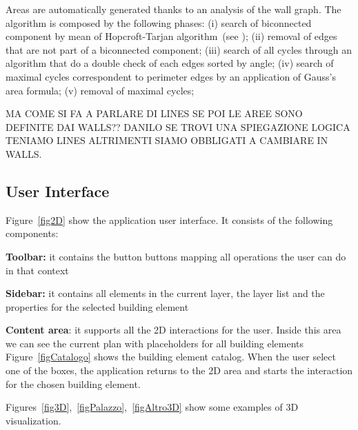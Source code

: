 Areas are automatically generated thanks to an analysis of the wall graph. The algorithm is composed by the following phases: (i) search of biconnected component by mean of Hopcroft-Tarjan algorithm~(see \cite{Hopcroft:1973:AEA:362248.362272}); (ii) removal of edges that are not part of a biconnected component; (iii) search of all cycles through an algorithm that do a double check of each edges sorted by angle; (iv) search of maximal cycles correspondent to perimeter edges by an application of Gauss's area formula; (v) removal of maximal cycles;


MA COME SI FA A PARLARE DI LINES SE POI LE AREE SONO DEFINITE DAI WALLS?? DANILO SE TROVI UNA SPIEGAZIONE LOGICA TENIAMO LINES ALTRIMENTI SIAMO OBBLIGATI A CAMBIARE IN WALLS.


\subsection{User Interface}\label{ssec:ui}

Figure~\ref{fig2D} show the application user interface. It consists of the following components:

\textbf{Toolbar:} it contains the button buttons mapping all operations the user can do in that context

\textbf{Sidebar:} it contains all elements in the current layer, the layer list and the properties for the selected building element

\textbf{Content area}: it supports all the 2D interactions for the user. Inside this area we can see the current plan with placeholders for all building elements\\

Figure~\ref{figCatalogo} shows the building element catalog. When the user select one of the boxes, the application returns to the 2D area and starts the interaction for the chosen building element.

Figures~\ref{fig3D},~\ref{figPalazzo},~\ref{figAltro3D} show some examples of 3D visualization.
